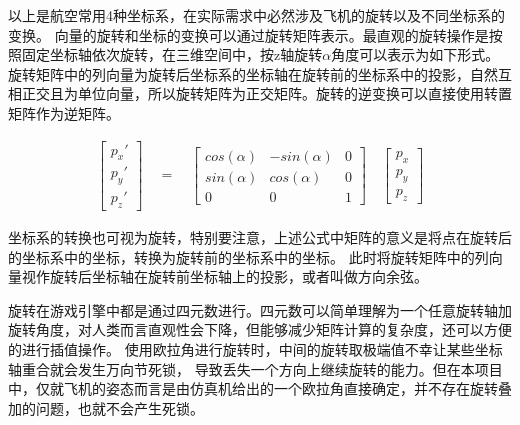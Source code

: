 \par
以上是航空常用4种坐标系，在实际需求中必然涉及飞机的旋转以及不同坐标系的变换。
向量的旋转和坐标的变换可以通过旋转矩阵表示\cite{rotate1}。最直观的旋转操作是按照固定坐标轴依次旋转，在三维空间中，按z轴旋转$\alpha$角度可以表示为如下形式。
旋转矩阵中的列向量为旋转后坐标系的坐标轴在旋转前的坐标系中的投影，自然互相正交且为单位向量，所以旋转矩阵为正交矩阵。旋转的逆变换可以直接使用转置矩阵作为逆矩阵。

\begin{equation} 
    \begin{gathered}
        \begin{bmatrix} p_x' \\ p_y' \\ p_z'\end{bmatrix} 
        \quad 
        =
        \quad
        \begin{bmatrix} 
            cos(\alpha) & -sin(\alpha) & 0 \\
            sin(\alpha) & cos(\alpha) & 0 \\ 
            0 & 0 & 1
        \end{bmatrix}
        \quad
        \begin{bmatrix} p_x\\ p_y \\ p_z \end{bmatrix}
    \end{gathered}\nonumber
\end{equation}

\par
坐标系的转换也可视为旋转，特别要注意，上述公式中矩阵的意义是将点在旋转后的坐标系中的坐标，转换为旋转前的坐标系中的坐标。
此时将旋转矩阵中的列向量视作旋转后坐标轴在旋转前坐标轴上的投影，或者叫做方向余弦。

\par 
旋转在游戏引擎中都是通过四元数进行。四元数可以简单理解为一个任意旋转轴加旋转角度，对人类而言直观性会下降，但能够减少矩阵计算的复杂度，还可以方便的进行插值操作\cite{rotate2}。
使用欧拉角进行旋转时，中间的旋转取极端值不幸让某些坐标轴重合就会发生万向节死锁，
导致丢失一个方向上继续旋转的能力\cite{rotate3}。但在本项目中，仅就飞机的姿态而言是由仿真机给出的一个欧拉角直接确定，并不存在旋转叠加的问题，也就不会产生死锁。
